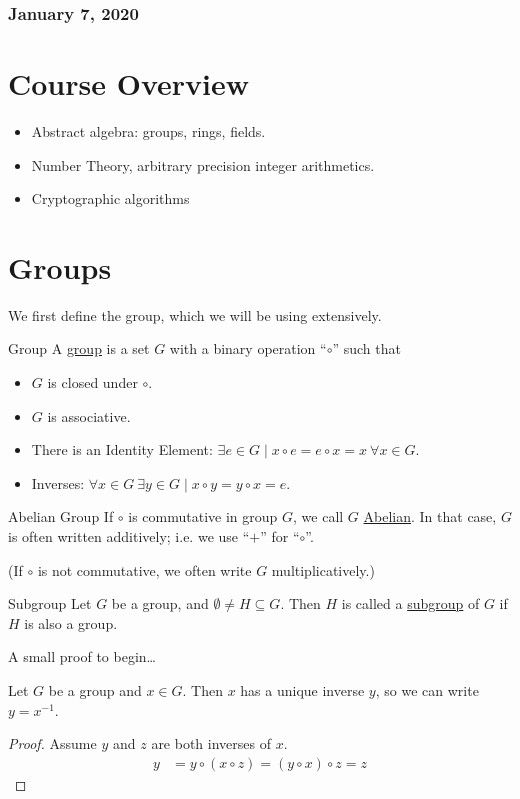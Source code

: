 \subsubsection*{January 7, 2020}
\section*{Course Overview}
\begin{itemize}
	\item Abstract algebra: groups, rings, fields.
	\item Number Theory, arbitrary precision integer arithmetics. 
	\item Cryptographic algorithms
\end{itemize}
\section{Groups}
We first define the group, which we will be using extensively. 
\begin{defn}{Group}
	A \ul{group} is a set $G$ with a binary operation ``$\circ$'' such that
	\begin{itemize}
		\item $G$ is closed under $\circ$.
		\item $G$ is associative. 
		\item There is an Identity Element: $\exists e\in G \mid x\circ e = e\circ x = x \ \forall x\in G$. 
		\item Inverses: $\forall x \in G\ \exists y\in G\mid x\circ y = y \circ x = e$. 
	\end{itemize}
\end{defn}

\begin{defn}{Abelian Group}
If $\circ$ is commutative in group $G$, we call $G$ \ul{Abelian}. In that case, $G$ is often written additively; i.e. we use ``$+$'' for ``$\circ$''.

(If $\circ$ is not commutative, we often write $G$ multiplicatively.)	
\end{defn}

\begin{defn}{Subgroup}
Let $G$ be a group, and $\emptyset\neq H \subseteq G$. Then $H$ is called a \ul{subgroup} of $G$ if $H$ is also a group. 
\end{defn}

A small proof to begin\dots 
\begin{proposition}
Let $G$ be a group and $x\in G$. Then $x$ has a unique inverse $y$, so we can write $y=x^{-1}$. 
\end{proposition}
\begin{proof}
Assume $y$ and $z$ are both inverses of $x$. 
\begin{align*}
y &= y \circ (x\circ z) = (y\circ x) \circ z = z	
\end{align*}
\end{proof}

